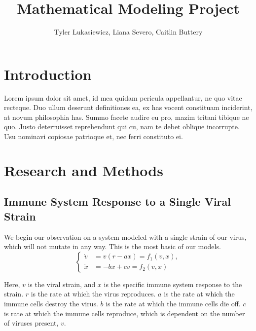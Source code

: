 \documentclass{article}
\title{Mathematical Modeling Project}
\author{Tyler Lukasiewicz, Liana Severo, Caitlin Buttery}
\begin{document}
\maketitle
{}
\section{Introduction}
\label{sec:Introduction}
Lorem ipsum dolor sit amet, id mea quidam pericula appellantur, ne quo vitae recteque. Duo ullum deserunt definitiones ea, ex has vocent constituam inciderint, at novum philosophia has. Summo facete audire eu pro, mazim tritani tibique ne quo. Justo deterruisset reprehendunt qui cu, nam te debet oblique incorrupte. Usu nominavi copiosae patrioque et, nec ferri constituto ei.


\section{Research and Methods}
\label{sec:Main part}

\subsection{Immune System Response to a Single Viral Strain}
We begin our observation on a system modeled with a single strain of our virus, which will not mutate in any way. This is the most basic of our models. 
\begin{equation}
    \begin{cases}
        \dot v &= v(r-ax) = f_1(v,x), \\
        \dot x &= -bx + cv = f_2(v,x)
    \end{cases}
\end{equation}

Here, $v$ is the viral strain, and $x$ is the specific immune system response to the strain. $r$ is the rate at which the virus reproduces. $a$ is the rate at which the immune cells destroy the virus. $b$ is the rate at which the immune cells die off. $c$ is rate at which the immune cells reproduce, which is dependent on the number of viruses present, $v$.  
\end{document}
